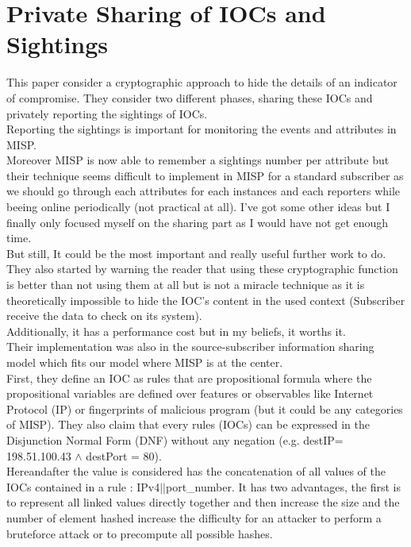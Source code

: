 \documentclass{eplmastersthesis}
\begin{document}
\section{Private Sharing of IOCs and Sightings \cite{van2016private}}
This paper consider a cryptographic approach to hide the details of an indicator of compromise. They consider two different phases, sharing these IOCs and privately reporting the sightings of IOCs.\\

Reporting the sightings is important for monitoring the events and attributes in MISP.\\ 
Moreover MISP is now able to remember a sightings number per attribute but their technique seems difficult to implement in MISP for a standard subscriber as we should go through each attributes for each instances and each reporters while beeing online periodically (not practical at all). I've got some other ideas but I finally only focused myself on the sharing part as I would have not get enough time.\\ 
But still, It could be the most important and really useful further work to do.\\

They also started by warning the reader that using these cryptographic function is better than not using them at all but is not a miracle technique as it is theoretically impossible to hide the IOC’s content in the used context (Subscriber receive the data to check on its system).\\
Additionally, it has a performance cost but in my beliefs, it worths it.\\ Their implementation was also in the source-subscriber information sharing model which fits our model where MISP is at the center.\\
First, they define an IOC as rules that are propositional formula where the propositional variables are defined over features or observables like Internet Protocol (IP) or fingerprints of malicious program (but it could be any categories of MISP). They also claim that every rules (IOCs) can be expressed in the Disjunction Normal Form (DNF) without any negation (e.g. destIP= 198.51.100.43 $\land$ destPort = 80).\\
Hereandafter the value is considered has the concatenation of all values of the IOCs contained in a rule : IPv4$||$port\_number. It has two advantages, the first is to represent all linked values directly together and then increase the size and the number of element hashed increase the difficulty for an attacker to perform a bruteforce attack or to precompute all possible hashes.\\
\end{document}

